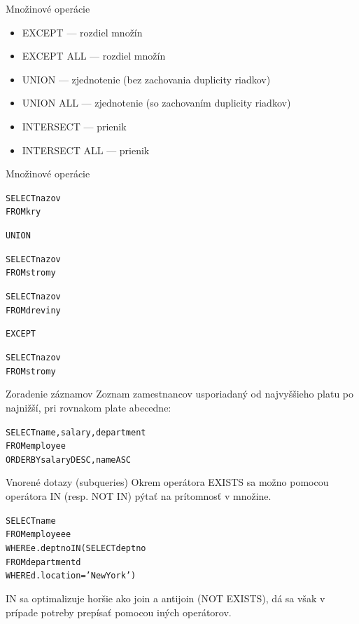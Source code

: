 \documentclass[12pt]{beamer}
\begin{document}
\begin{frame}{Množinové operácie}
\begin{itemize}
\item EXCEPT --- rozdiel množín
\item EXCEPT ALL --- rozdiel množín
\item UNION --- zjednotenie (bez zachovania duplicity riadkov)
\item UNION ALL --- zjednotenie (so zachovaním duplicity riadkov)
\item INTERSECT --- prienik
\item INTERSECT ALL --- prienik %
\end{itemize}
\end{frame}

\begin{frame}[fragile]{Množinové operácie}
\begin{minipage}{.4\pdfpagewidth}
\begin{alltt}
SELECT nazov
FROM kry

\alert{UNION}

SELECT nazov
FROM stromy
\end{alltt}
\end{minipage}
\begin{minipage}{.4\pdfpagewidth}
\begin{alltt}
SELECT nazov
FROM dreviny

\alert{EXCEPT}

SELECT nazov
FROM stromy
\end{alltt}
\end{minipage}
\end{frame}

\begin{frame}[fragile]{Zoradenie záznamov}
Zoznam zamestnancov usporiadaný od najvyššieho platu po najnižší, pri rovnakom plate abecedne:
\begin{alltt}
SELECT name, salary, department
FROM employee
\alert{ORDER BY} salary DESC, name ASC
\end{alltt}
\end{frame}

\begin{frame}[fragile]{Vnorené dotazy (subqueries)}
Okrem operátora EXISTS sa možno pomocou operátora IN (resp. NOT IN) pýtať na prítomnosť v množine.
\begin{alltt}
SELECT name
FROM employee e
WHERE e.deptno \alert{IN} (SELECT deptno
                   FROM department d
                   WHERE d.location = 'New York')
\end{alltt}
IN sa optimalizuje horšie ako join a antijoin (NOT EXISTS), dá sa však v prípade potreby prepísať pomocou iných operátorov.
\end{frame}
\end{document}
